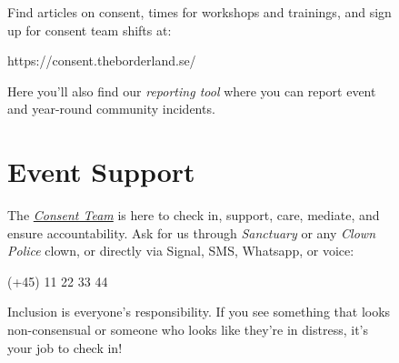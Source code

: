 \documentclass[a4paper,english,12pt]{article}
\begin{document}
\begin{figure}[!b]
\begin{minipage}{.835\textwidth}
    \vspace{3mm}
    Find articles on consent, times for workshops and trainings, and sign up for consent team shifts at:
    \vspace{-2mm}
    \begin{center}
      \Large{https://consent.theborderland.se/}
    \end{center}

    \vspace{3mm}
    Here you'll also find our \emph{reporting tool} where you can report event and year-round community incidents.

    \vspace{-4mm}
    \section*{Event Support}
    \vspace{-3mm}






    The \emph{\underline{Consent Team}} is here to check in, support, care, mediate, and ensure accountability. Ask for us through \emph{Sanctuary} or any \emph{Clown Police} clown, or directly via Signal, SMS, Whatsapp, or voice:

    \vspace{-2mm}
    \begin{center}
      \Large{(+45) 11 22 33 44}
    \end{center}
    \vspace{2mm}
    
    Inclusion is everyone's responsibility. If you see something that looks non-consensual or someone who looks like they're in distress, it's your job to check in!
  \end{minipage}

\end{figure}
\end{document}
